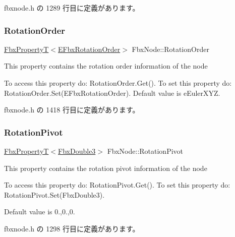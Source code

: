  fbxnode.\+h の 1289 行目に定義があります。

\mbox{\label{class_fbx_node_ac985c192cf9439c2618de0de4ef46ab1}} 
\subsubsection{\texorpdfstring{Rotation\+Order}{RotationOrder}}
{\footnotesize\ttfamily \hyperlink{class_fbx_property_t}{Fbx\+PropertyT}$<$\hyperlink{fbxmath_8h_ae46778666b56bb0abe5992b855fe9332}{E\+Fbx\+Rotation\+Order}$>$ Fbx\+Node\+::\+Rotation\+Order}

This property contains the rotation order information of the node

To access this property do\+: Rotation\+Order.\+Get(). To set this property do\+: Rotation\+Order.\+Set(\+E\+Fbx\+Rotation\+Order). Default value is e\+Euler\+X\+YZ. 

 fbxnode.\+h の 1418 行目に定義があります。

\mbox{\label{class_fbx_node_ad9175d66436673534fda8fa58d457e01}} 
\subsubsection{\texorpdfstring{Rotation\+Pivot}{RotationPivot}}
{\footnotesize\ttfamily \hyperlink{class_fbx_property_t}{Fbx\+PropertyT}$<$\hyperlink{fbxtypes_8h_ae0a96f14cde566774c7553aa7523b7a7}{Fbx\+Double3}$>$ Fbx\+Node\+::\+Rotation\+Pivot}

This property contains the rotation pivot information of the node

To access this property do\+: Rotation\+Pivot.\+Get(). To set this property do\+: Rotation\+Pivot.\+Set(\+Fbx\+Double3).

Default value is 0.,0.,0. 

 fbxnode.\+h の 1298 行目に定義があります。

\mbox{\label{class_fbx_node_a7fe7f807388b6d974c612bbf432604e4}} 
